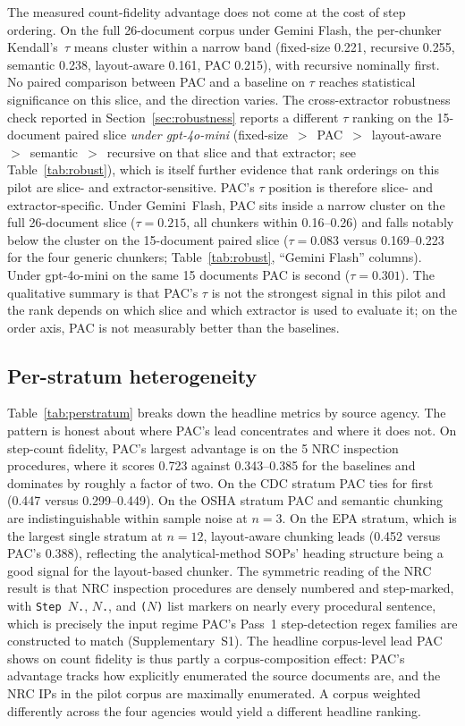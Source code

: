 \documentclass[make,article,submit,oneauthor,pdftex]{Definitions/mdpi}
\begin{document}
The measured count-fidelity advantage does not come at the cost of
step ordering. On the full 26-document corpus under Gemini Flash, the
per-chunker Kendall's~$\tau$ means cluster within a narrow band
(fixed-size 0.221, recursive 0.255, semantic 0.238, layout-aware
0.161, PAC 0.215), with recursive nominally first. No paired
comparison between PAC and a baseline on $\tau$ reaches statistical
significance on this slice, and the direction varies. The
cross-extractor robustness check reported in
Section~\ref{sec:robustness} reports a different $\tau$ ranking on
the 15-document paired slice \emph{under gpt-4o-mini}
(fixed-size~$>$~PAC~$>$~layout-aware~$>$~semantic~$>$~recursive on
that slice and that extractor; see Table~\ref{tab:robust}), which is
itself further evidence that rank orderings on this pilot are
slice- and extractor-sensitive. PAC's $\tau$ position is therefore
slice- and extractor-specific. Under Gemini~Flash, PAC sits inside a
narrow cluster on the full 26-document slice ($\tau=0.215$, all
chunkers within 0.16--0.26) and falls notably below the cluster on
the 15-document paired slice ($\tau=0.083$ versus 0.169--0.223 for
the four generic chunkers; Table~\ref{tab:robust}, ``Gemini Flash''
columns). Under gpt-4o-mini on the same 15 documents PAC is second
($\tau=0.301$). The qualitative summary is that PAC's $\tau$ is not
the strongest signal in this pilot and the rank depends on which
slice and which extractor is used to evaluate it; on the order axis,
PAC is not measurably better than the baselines.

\subsection{Per-stratum heterogeneity}\label{sec:perstratum}

Table~\ref{tab:perstratum} breaks down the headline metrics by source
agency. The pattern is honest about where PAC's lead concentrates and
where it does not. On step-count fidelity, PAC's largest advantage is
on the 5 NRC inspection procedures, where it scores 0.723 against
0.343--0.385 for the baselines and dominates by roughly a factor of
two. On the CDC stratum PAC ties for first (0.447 versus
0.299--0.449). On the OSHA stratum PAC and semantic chunking are
indistinguishable within sample noise at $n=3$. On the EPA stratum,
which is the largest single stratum at $n=12$, layout-aware chunking
leads (0.452 versus PAC's 0.388), reflecting the analytical-method
SOPs' heading structure being a good signal for the layout-based
chunker. The symmetric reading of the NRC result is that NRC
inspection procedures are densely numbered and step-marked, with
\texttt{Step~$N$.}, \texttt{$N$.}, and \texttt{($N$)} list markers on
nearly every procedural sentence, which is precisely the input regime
PAC's Pass~1 step-detection regex families are constructed to match
(Supplementary~S1). The headline corpus-level lead PAC shows on
count fidelity is thus partly a corpus-composition effect: PAC's
advantage tracks how explicitly enumerated the source documents are,
and the NRC IPs in the pilot corpus are maximally enumerated. A
corpus weighted differently across the four agencies would yield a
different headline ranking.
\end{document}

